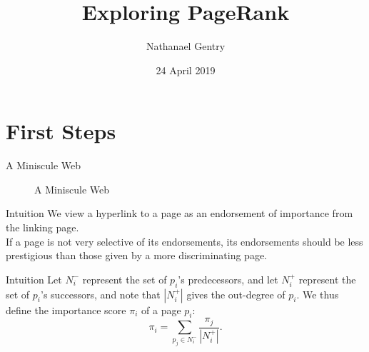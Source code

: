\documentclass{beamer}
\title[Short title]{Exploring PageRank}
\author{Nathanael Gentry}
\institute[LU]{MATH 321}
\date{24 April 2019}
\begin{document}
\begin{frame}
\titlepage
\end{frame}

\section{First Steps}
\begin{frame}[label=web]{A Miniscule Web}
    	\begin{figure}[h]
		\centering {}
		\caption{A Miniscule Web}
		\label{fig:web}
	\end{figure}
\end{frame}

\begin{frame}{Intuition}
    We view a hyperlink to a page as an endorsement of importance from the linking page.\\
    \vspace{1mm}
    If a page is not very selective of its endorsements, its endorsements should be less prestigious than those given by a more discriminating page.
\end{frame}

\begin{frame}{Intuition}
    Let $N^-_i$ represent the set of $p_i$'s predecessors, and let $N^+_i$ represent the set of $p_i$'s successors, and note that $|N^+_i|$ gives the out-degree of $p_i$. We thus define the importance score $\pi_i$ of a page $p_i$:
 	\begin{equation*}
 		\pi_i = \sum_{p_j\in N^-_i}{\frac{\pi_j}{|N^+_i|}}.
 	\end{equation*}
\end{frame}
\end{document}
